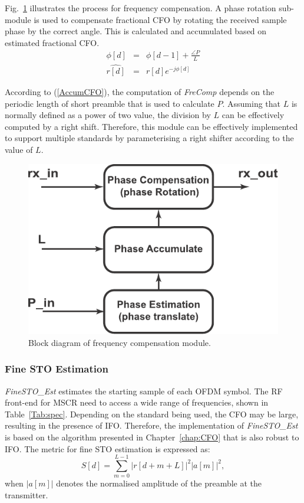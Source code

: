 Fig.~\ref{fig:FFO} illustrates the process for frequency compensation.
A phase rotation sub-module is used to compensate fractional CFO by rotating the received sample phase by the correct angle.
This is calculated and accumulated based on estimated fractional CFO.
\begin{eqnarray}
\label{AccumCFO}
\phi[d] &=& \phi[d-1] + \frac{\angle P}{L} \nonumber \\
\widehat{r[d]} &=& r[d] e^{-j \phi[d]}
\end{eqnarray}

According to (\ref{AccumCFO}), the computation of \emph{FreComp} depends on the periodic length of short preamble that is used to calculate $P$.
Assuming that $L$ is normally defined as a power of two value, the division by $L$ can be effectively computed by a right shift.
Therefore, this module can be effectively implemented to support multiple standards by parameterising a right shifter according to the value of $L$.
\begin{figure}
\centering
\includegraphics [width=0.5\columnwidth]{Figures/MSCR_RX_FFO.pdf}
\caption{Block diagram of frequency compensation module.}
\label{fig:FFO}
\end{figure}

\subsubsection{Fine STO Estimation}
\emph{FineSTO\_Est} estimates the starting sample of each OFDM symbol.
The RF front-end for MSCR need to access a wide range of frequencies, shown in Table~\ref{Tab:spec}. Depending on the standard being used, the CFO may be large, resulting in the presence of IFO.
Therefore, the implementation of \emph{FineSTO\_Est} is based on the algorithm presented in Chapter~\ref{chap:CFO} that is also robust to IFO.
The metric for fine STO estimation is expressed as:
\begin{equation}
\label{ProposedR}
S[d] =\sum_{m =0}^{L-1}   |r[d+m+L]|^2  |a[m]|^2,
\end{equation}
when $|a[m]|$ denotes the normalised amplitude of the preamble at the transmitter.

